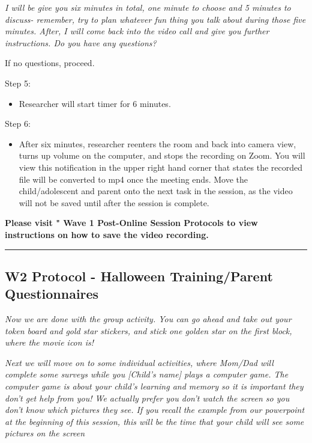 \documentclass[
]{book}
\providecommand{\tightlist}{%
  \setlength{\itemsep}{0pt}\setlength{\parskip}{0pt}}
\begin{document}
\emph{I will be give you six minutes in total, one minute to choose and 5 minutes to discuss- remember, try to plan whatever fun thing you talk about during those five minutes. After, I will come back into the video call and give you further instructions. Do you have any questions?}

If no questions, proceed.

Step 5:

\begin{itemize}
\tightlist
\item
  Researcher will start timer for 6 minutes.
\end{itemize}

Step 6:

\begin{itemize}
\tightlist
\item
  After six minutes, researcher reenters the room and back into camera view, turns up volume on the computer, and stops the recording on Zoom. You will view this notification in the upper right hand corner that states the recorded file will be converted to mp4 once the meeting ends. Move the child/adolescent and parent onto the next task in the session, as the video will not be saved until after the session is complete.
\end{itemize}

\textbf{Please visit " Wave 1 Post-Online Session Protocols to view instructions on how to save the video recording.}

\begin{center}\rule{0.5\linewidth}{0.5pt}\end{center}

\hypertarget{w2-protocol---halloween-trainingparent-questionnaires}{%
\subsection{W2 Protocol - Halloween Training/Parent Questionnaires}\label{w2-protocol---halloween-trainingparent-questionnaires}}

\emph{Now we are done with the group activity. You can go ahead and take out your token board and gold star stickers, and stick one golden star on the first block, where the movie icon is!}

\emph{Next we will move on to some individual activities, where Mom/Dad will complete some surveys while you {[}Child's name{]} plays a computer game. The computer game is about your child's learning and memory so it is important they don't get help from you! We actually prefer you don't watch the screen so you don't know which pictures they see. If you recall the example from our powerpoint at the beginning of this session, this will be the time that your child will see some pictures on the screen}
\end{document}
